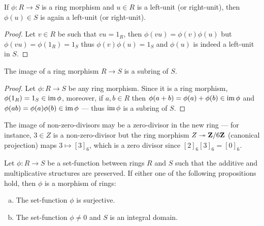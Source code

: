 %
\begin{corollary}
    \label{cor:ring-morphisms-preserve-units}
    If \(\phi: R \to S\) is a ring morphism and \(u \in R\) is a left-unit (or
    right-unit), then \(\phi(u) \in S\) is again a left-unit (or right-unit).
\end{corollary}
%

%
\begin{proof}
    Let \(v \in R\) be such that \(v u = 1_R\), then \(\phi(v u) = \phi(v) \phi(u)\)
    but \(\phi(v u) = \phi(1_R) = 1_S\) thus \(\phi(v) \phi(u) = 1_S\) and
    \(\phi(u)\) is indeed a left-unit in \(S\).
\end{proof}
%

%
\begin{proposition}
    \label{prop:image-of-morphism-is-subring}
    The image of a ring morphism \(R \to S\) is a subring of \(S\).
\end{proposition}
%

%
\begin{proof}
    Let \(\phi: R \to S\) be any ring morphism. Since it is a ring morphism,
    \(\phi(1_R) = 1_S \in \operatorname{im} \phi\), moreover, if \(a, b \in R\) then \(\phi(a + b)
    = \phi(a) + \phi(b) \in \operatorname{im} \phi\) and \(\phi(a b) = \phi(a) \phi(b) \in \operatorname{im}
    \phi\) --- thus \(\operatorname{im} \phi\) is a subring of \(S\).
\end{proof}
%

%
\begin{remark}
    \label{rem:non-zero-divisors-may-not-be-preserved}
    The image of non-zero-divisors may be a zero-divisor in the new ring --- for
    instance, \(3 \in Z\) is a non-zero-divisor but the ring morphism
    \(Z \twoheadrightarrow \mathbf{Z}/6\mathbf{Z}\) (canonical projection) maps \(3 \mapsto [3]_6\), which is a
    zero divisor since \([2]_6 [3]_6 = [0]_6\).
\end{remark}
%

%
\begin{proposition}
    \label{prop:sufficient-conditions-morphism-of-rings}
    Let \(\phi: R \to S\) be a set-function between rings \(R\) and \(S\) such that
    the additive and multiplicative structures are preserved. If either one of the
    following propositions hold, then \(\phi\) is a morphism of rings:
    \begin{enumerate}[(a)]\setlength\itemsep{0em}
        \item The set-function \(\phi\) is surjective.

        \item The set-function \(\phi \neq 0\) and \(S\) is an integral domain.
    \end{enumerate}
\end{proposition}
%

